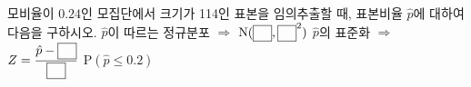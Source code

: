 모비율이 $0.24$인 모집단에서 크기가 114인 표본을 임의추출할 때, 표본비율 $\hat{p}$에 대하여 다음을 구하시오. 
 $\hat{p}$이 따르는 정규분포 $\Rightarrow$ $\mathrm{N}(\blank{,}\mkern3mu\mathopen{}{\blank}^2)$
 $\hat{p}$의 표준화 $\Rightarrow$ $Z=\dfrac{\hat{p}-\blank}{\blank}$
 $\mathrm{P}(\hat{p}\le 0.2)$
